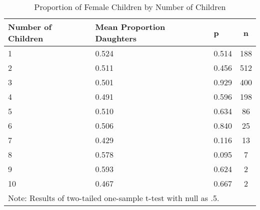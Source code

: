 \begin{table}[!htb]
\centering
\caption{Proportion of Female Children by Number of Children} 
\label{tab:balance_prop_female_nchild}
\begingroup\small
\begin{tabular}{lllc}
  \hline
Number of Children & Mean Proportion Daughters & p & n \\ 
  \hline
   1 & 0.524 & 0.514 &  188 \\ 
     2 & 0.511 & 0.456 &  512 \\ 
     3 & 0.501 & 0.929 &  400 \\ 
     4 & 0.491 & 0.596 &  198 \\ 
     5 & 0.510 & 0.634 &   86 \\ 
     6 & 0.506 & 0.840 &   25 \\ 
     7 & 0.429 & 0.116 &   13 \\ 
     8 & 0.578 & 0.095 &    7 \\ 
     9 & 0.593 & 0.624 &    2 \\ 
    10 & 0.467 & 0.667 &    2 \\ 
   \hline 
 \multicolumn{3}{l}{\scriptsize{Note: Results of two-tailed one-sample t-test with null as .5.}} \hline
\end{tabular}
\endgroup
\end{table}
